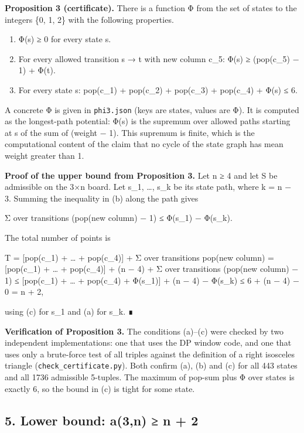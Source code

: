 \documentclass[
  11pt,
]{article}
\providecommand{\tightlist}{%
  \setlength{\itemsep}{0pt}\setlength{\parskip}{0pt}}
\begin{document}
\textbf{Proposition 3 (certificate).} There is a function Φ from the set
of states to the integers \{0, 1, 2\} with the following properties.

\begin{enumerate}
\def\labelenumi{(\alph{enumi})}
\tightlist
\item
  Φ(s) ≥ 0 for every state s.
\item
  For every allowed transition s → t with new column c\_5: Φ(s) ≥
  (pop(c\_5) − 1) + Φ(t).
\item
  For every state s: pop(c\_1) + pop(c\_2) + pop(c\_3) + pop(c\_4) +
  Φ(s) ≤ 6.
\end{enumerate}

A concrete Φ is given in \texttt{phi3.json} (keys are states, values are
Φ). It is computed as the longest-path potential: Φ(s) is the supremum
over allowed paths starting at s of the sum of (weight − 1). This
supremum is finite, which is the computational content of the claim that
no cycle of the state graph has mean weight greater than 1.

\textbf{Proof of the upper bound from Proposition 3.} Let n ≥ 4 and let
S be admissible on the 3×n board. Let s\_1, \ldots, s\_k be its state
path, where k = n − 3. Summing the inequality in (b) along the path
gives

Σ over transitions (pop(new column) − 1) ≤ Φ(s\_1) − Φ(s\_k).

The total number of points is

T = {[}pop(c\_1) + \ldots{} + pop(c\_4){]} + Σ over transitions pop(new
column) = {[}pop(c\_1) + \ldots{} + pop(c\_4){]} + (n − 4) + Σ over
transitions (pop(new column) − 1) ≤ {[}pop(c\_1) + \ldots{} + pop(c\_4)
+ Φ(s\_1){]} + (n − 4) − Φ(s\_k) ≤ 6 + (n − 4) − 0 = n + 2,

using (c) for s\_1 and (a) for s\_k. ∎

\textbf{Verification of Proposition 3.} The conditions (a)--(c) were
checked by two independent implementations: one that uses the DP window
code, and one that uses only a brute-force test of all triples against
the definition of a right isosceles triangle
(\texttt{check\_certificate.py}). Both confirm (a), (b) and (c) for all
443 states and all 1736 admissible 5-tuples. The maximum of pop-sum plus
Φ over states is exactly 6, so the bound in (c) is tight for some state.

\subsection{5. Lower bound: a(3,n) ≥ n + 2}\label{lower-bound-a3n-n-2}
\end{document}

